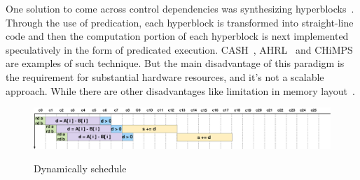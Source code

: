 


One solution to come across control dependencies was synthesizing hyperblocks~\cite{hyperblock}.
Through the use of predication, each hyperblock is transformed into straight-line code and then the computation portion of each hyperblock is next implemented speculatively in the form of predicated execution.
CASH~\cite{budiu_cash_2002, budiu_pegasus_2002}, AHRL~\cite{ahrl} and CHiMPS~\cite{chimps} are examples of such technique. But the main disadvantage of this paradigm is the requirement for substantial hardware resources, and it's not a scalable approach. While there are other disadvantages like limitation in memory layout~\cite{spatial_computation}.

\begin{figure}[!h]
    \centering
    \includegraphics[width=1\textwidth]{figures/Introduction/schedule_dynamic.pdf}
    \label{fig:dynamic_schedule}
    \caption{Dynamically schedule}
\end{figure}  



